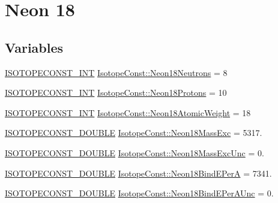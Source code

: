 \hypertarget{group___isotope_const-_neon-_ne18}{}\section{Neon 18}
\label{group___isotope_const-_neon-_ne18}
\subsection*{Variables}
\begin{DoxyCompactItemize}
\item 
\mbox{\hyperlink{group___isotope_const-_macros_ga5f18360b3e99483a35c32d789e62621c}{I\+S\+O\+T\+O\+P\+E\+C\+O\+N\+S\+T\+\_\+\+I\+NT}} \mbox{\hyperlink{group___isotope_const-_neon-_ne18_ga4aa5568e5573962f5832ccab0c94bb0f}{Isotope\+Const\+::\+Neon18\+Neutrons}} = 8
\item 
\mbox{\hyperlink{group___isotope_const-_macros_ga5f18360b3e99483a35c32d789e62621c}{I\+S\+O\+T\+O\+P\+E\+C\+O\+N\+S\+T\+\_\+\+I\+NT}} \mbox{\hyperlink{group___isotope_const-_neon-_ne18_ga6e067121c43aeee00e7f81afe2546ad5}{Isotope\+Const\+::\+Neon18\+Protons}} = 10
\item 
\mbox{\hyperlink{group___isotope_const-_macros_ga5f18360b3e99483a35c32d789e62621c}{I\+S\+O\+T\+O\+P\+E\+C\+O\+N\+S\+T\+\_\+\+I\+NT}} \mbox{\hyperlink{group___isotope_const-_neon-_ne18_gab7f78c9ba7a26a94347ca7ae216be411}{Isotope\+Const\+::\+Neon18\+Atomic\+Weight}} = 18
\item 
\mbox{\hyperlink{group___isotope_const-_macros_ga8f45a7272ce02c0b4c65c44636ed719a}{I\+S\+O\+T\+O\+P\+E\+C\+O\+N\+S\+T\+\_\+\+D\+O\+U\+B\+LE}} \mbox{\hyperlink{group___isotope_const-_neon-_ne18_ga85b3663a8c1d630b50f29c98abf94805}{Isotope\+Const\+::\+Neon18\+Mass\+Exc}} = 5317.
\item 
\mbox{\hyperlink{group___isotope_const-_macros_ga8f45a7272ce02c0b4c65c44636ed719a}{I\+S\+O\+T\+O\+P\+E\+C\+O\+N\+S\+T\+\_\+\+D\+O\+U\+B\+LE}} \mbox{\hyperlink{group___isotope_const-_neon-_ne18_ga168e22e95234527bb9de10776d0d8c11}{Isotope\+Const\+::\+Neon18\+Mass\+Exc\+Unc}} = 0.
\item 
\mbox{\hyperlink{group___isotope_const-_macros_ga8f45a7272ce02c0b4c65c44636ed719a}{I\+S\+O\+T\+O\+P\+E\+C\+O\+N\+S\+T\+\_\+\+D\+O\+U\+B\+LE}} \mbox{\hyperlink{group___isotope_const-_neon-_ne18_gaf00bb9aa668c3c52b97cb6218f053f4d}{Isotope\+Const\+::\+Neon18\+Bind\+E\+PerA}} = 7341.
\item 
\mbox{\hyperlink{group___isotope_const-_macros_ga8f45a7272ce02c0b4c65c44636ed719a}{I\+S\+O\+T\+O\+P\+E\+C\+O\+N\+S\+T\+\_\+\+D\+O\+U\+B\+LE}} \mbox{\hyperlink{group___isotope_const-_neon-_ne18_gaf2b6cedc33a25ecfe31d34a7003ce908}{Isotope\+Const\+::\+Neon18\+Bind\+E\+Per\+A\+Unc}} = 0.

\end{DoxyCompactItemize}
